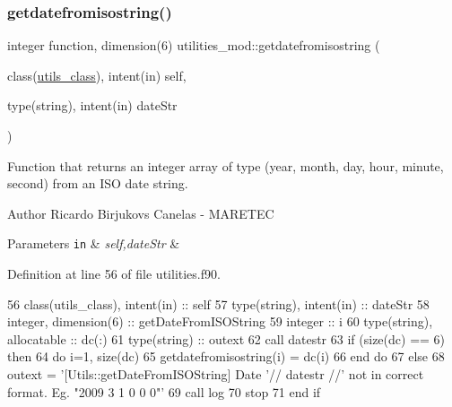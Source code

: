 \subsubsection{\texorpdfstring{getdatefromisostring()}{getdatefromisostring()}}
{\footnotesize\ttfamily integer function, dimension(6) utilities\+\_\+mod\+::getdatefromisostring (\begin{DoxyParamCaption}\item[{class(\mbox{\hyperlink{structutilities__mod_1_1utils__class}{utils\+\_\+class}}), intent(in)}]{self,  }\item[{type(string), intent(in)}]{date\+Str }\end{DoxyParamCaption})\hspace{0.3cm}{\ttfamily [private]}}



Function that returns an integer array of type (year, month, day, hour, minute, second) from an I\+SO date string. 

\begin{DoxyAuthor}{Author}
Ricardo Birjukovs Canelas -\/ M\+A\+R\+E\+T\+EC 
\end{DoxyAuthor}

\begin{DoxyParams}[1]{Parameters}
\mbox{\tt in}  & {\em self,date\+Str} & \\
\hline
\end{DoxyParams}


Definition at line 56 of file utilities.\+f90.


\begin{DoxyCode}
56     \textcolor{keywordtype}{class}(utils\_class), \textcolor{keywordtype}{intent(in)} :: self
57     \textcolor{keywordtype}{type}(string), \textcolor{keywordtype}{intent(in)} :: dateStr
58     \textcolor{keywordtype}{integer}, \textcolor{keywordtype}{dimension(6)} :: getDateFromISOString
59     \textcolor{keywordtype}{integer} :: i
60     \textcolor{keywordtype}{type}(string), \textcolor{keywordtype}{allocatable} :: dc(:)
61     \textcolor{keywordtype}{type}(string) :: outext
62     \textcolor{keyword}{call }datestr%
63     \textcolor{keywordflow}{if} (\textcolor{keyword}{size}(dc) == 6) \textcolor{keywordflow}{then}
64         \textcolor{keywordflow}{do} i=1, \textcolor{keyword}{size}(dc)
65             getdatefromisostring(i) = dc(i)%
66 \textcolor{keywordflow}{        end do}
67     \textcolor{keywordflow}{else}
68         outext = \textcolor{stringliteral}{'[Utils::getDateFromISOString] Date '}// datestr //\textcolor{stringliteral}{' not in correct format. Eg. "2009 3 1 0
       0 0"'}
69         \textcolor{keyword}{call }log%
70         stop
71 \textcolor{keywordflow}{    end if}    
\end{DoxyCode}
\mbox{\label{namespaceutilities__mod_a6ba00b0a503f26c7e755d1efbbe83c5b}} 
